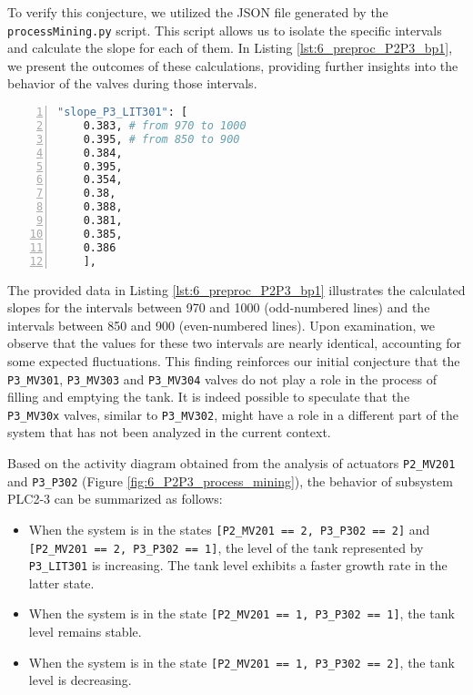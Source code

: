 To verify this conjecture, we utilized the JSON file generated by the \texttt{processMining.py} script. This script allows us to isolate the specific intervals and calculate the slope for each of them. In Listing \ref{lst:6_preproc_P2P3_bp1}, we present the outcomes of these calculations, providing further insights into the behavior of the valves during those intervals.

\begin{lstlisting}[language=bash, numbers=left, caption=Slope calculation of \texttt{P3\_LIT301} for the 850-900 and 970-1000 intervals related to tank levels, label=lst:6_preproc_P2P3_bp1]
	"slope_P3_LIT301": [
	0.383, # from 970 to 1000
	0.395, # from 850 to 900
	0.384,
	0.395,
	0.354,
	0.38,
	0.388,
	0.381,
	0.385,
	0.386
	],
\end{lstlisting}

The provided data in Listing \ref{lst:6_preproc_P2P3_bp1} illustrates the calculated slopes for the intervals between 970 and 1000 (odd-numbered lines) and the intervals between 850 and 900 (even-numbered lines). Upon examination, we observe that the values for these two intervals are nearly identical, accounting for some expected fluctuations. This finding reinforces our initial conjecture that the \texttt{P3\_MV301}, \texttt{P3\_MV303} and \texttt{P3\_MV304} valves do not play a role in the process of filling and emptying the tank. It is indeed possible to speculate that the \texttt{P3\_MV30x} valves, similar to \texttt{P3\_MV302}, might have a role in a different part of the system that has not been analyzed in the current context. 

\bigskip
Based on the activity diagram obtained from the analysis of actuators \texttt{P2\_MV201} and \texttt{P3\_P302} (Figure \ref{fig:6_P2P3_process_mining}), the behavior of subsystem PLC2-3 can be summarized as follows:

\begin{itemize}
	\item When the system is in the states \texttt{[P2\_MV201 == 2, P3\_P302 == 2]} and \texttt{[P2\_MV201 == 2, P3\_P302 == 1]}, the level of the tank represented by \texttt{P3\_LIT301} is increasing. The tank level exhibits a faster growth rate in the latter state.
	
	\item When the system is in the state \texttt{[P2\_MV201 == 1, P3\_P302 == 1]}, the tank level remains stable.
	
	\item When the system is in the state \texttt{[P2\_MV201 == 1, P3\_P302 == 2]}, the tank level is decreasing.
\end{itemize}

